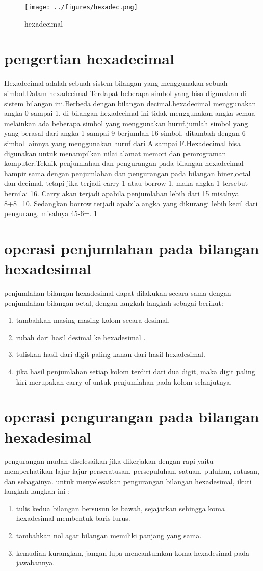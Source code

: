 \documentclass{article}
\begin{document}
\begin{figure}[ht]
\centerline{\texttt{[image: ../figures/hexadec.png]}}
\caption{hexadecimal}
\label{hexadec}
\end{figure}

\section{pengertian hexadecimal}
	Hexadecimal adalah sebuah sistem bilangan yang menggunakan sebuah simbol.Dalam hexadecimal Terdapat beberapa simbol yang bisa digunakan di sistem bilangan ini.Berbeda dengan bilangan decimal.hexadecimal menggunakan angka 0 sampai 1, di bilangan hexadecimal ini tidak menggunakan angka semua melainkan ada beberapa simbol yang menggunakan huruf.jumlah simbol yang yang berasal dari angka 1 sampai 9 berjumlah 16 simbol, ditambah dengan 6 simbol lainnya yang menggunakan huruf dari A sampai F.Hexadecimal bisa digunakan untuk menampilkan nilai alamat memori dan pemrograman komputer.Teknik penjumlahan dan pengurangan pada bilangan hexadecimal hampir sama dengan penjumlahan dan pengurangan pada bilangan biner,octal dan decimal, tetapi jika terjadi carry 1 atau borrow 1, maka angka 1 tersebut bernilai 16. Carry akan terjadi apabila penjumlahan lebih dari 15 misalnya 8+8=10. Sedangkan borrow terjadi apabila angka yang dikurangi lebih kecil dari pengurang, misalnya 45-6=. \ref{hexadec}
	\cite {schwarz1997implementation}
\section{operasi penjumlahan pada bilangan hexadesimal}
penjumlahan bilangan hexadesimal dapat dilakukan secara sama dengan penjumlahan bilangan octal, dengan langkah-langkah sebagai berikut: \begin{enumerate}
			\item tambahkan masing-masing kolom secara desimal. 
			\item rubah dari hasil desimal ke hexadesimal .
			\item tuliskan hasil dari digit paling kanan dari hasil hexadesimal. 
			\item jika hasil penjumlahan setiap kolom terdiri dari dua digit, maka digit paling kiri merupakan carry of untuk penjumlahan pada kolom selanjutnya.
			\end{enumerate}
\section{operasi pengurangan pada bilangan hexadesimal}
pengurangan mudah diselesaikan jika dikerjakan dengan rapi yaitu memperhatikan lajur-lajur perseratusan, persepuluhan, satuan, puluhan, ratusan, dan sebagainya. untuk menyelesaikan pengurangan bilangan hexadesimal, ikuti langkah-langkah ini :
	\begin{enumerate}
		\item tulis kedua bilangan bersusun ke bawah, sejajarkan sehingga koma hexadesimal membentuk baris lurus.
		\item tambahkan nol agar bilangan memiliki panjang yang sama.
		\item kemudian kurangkan, jangan lupa mencantumkan koma hexadesimal pada jawabannya.
	\end{enumerate}
\end{document}
